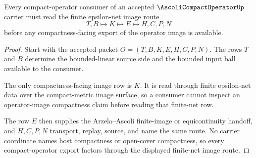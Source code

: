 \begin{theorem}
\label{thm:ascoli-compact-operator-finite-net-image}
Every compact-operator consumer of an accepted $\AscoliCompactOperatorUp$ carrier must read the finite epsilon-net image route
$$
T,B \longmapsto K \longmapsto E \longmapsto H,C,P,N
$$
before any compactness-facing export of the operator image is available.
\end{theorem}
\begin{proof}
Start with the accepted packet $O=(T,B,K,E,H,C,P,N)$. The rows $T$ and $B$ determine the bounded-linear source side and the bounded input ball available to the consumer.

The only compactness-facing image row is $K$. It is read through finite epsilon-net data over the compact-metric image surface, so a consumer cannot inspect an operator-image compactness claim before reading that finite-net row.

The row $E$ then supplies the Arzela--Ascoli finite-image or equicontinuity handoff, and $H,C,P,N$ transport, replay, source, and name the same route. No carrier coordinate names host compactness or open-cover compactness, so every compact-operator export factors through the displayed finite-net image route.
\end{proof}




